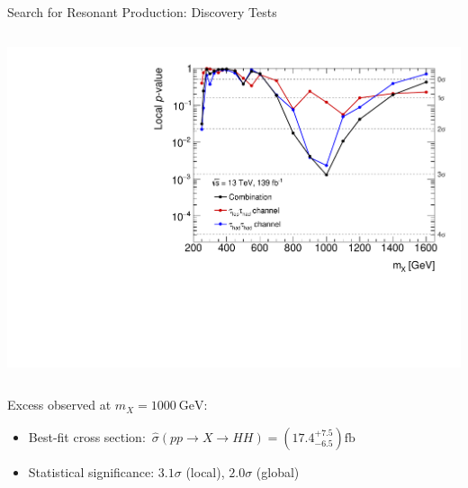 \documentclass[11pt, xcolor={dvipsnames}, aspectratio=169, notes]{beamer}
\begin{document}
\begin{frame}{Search for Resonant \allbold{\HH} Production: Discovery Tests}
  \vspace*{0.5em}
  \begin{columns}[onlytextwidth, b]
    \centering

    \includegraphics[width=1.0\textwidth, trim=0 0.3em 0 1em]{results_res/resonant_comb_pvalues}

    \centering

  \end{columns}

  Excess observed at $m_{X} = \SI{1000}{\GeV}$:\\[0.4em]
  \begin{itemize}
    \setlength{\itemsep}{0.4em}
  \item Best-fit cross section:~$\hat{\sigma}(pp \to X \to HH) = \left( 17.4^{+7.5}_{-6.5}
    \right)\si{\femto\barn}$
  \item Statistical significance: $3.1\sigma$ (local), $2.0\sigma$ (global)
  \end{itemize}


\end{frame}
\end{document}
